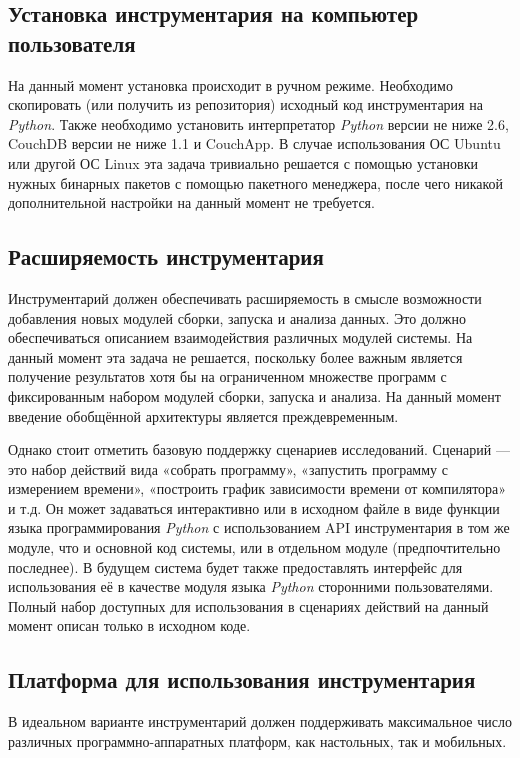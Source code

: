 \subsection{Установка инструментария на компьютер пользователя}
На данный момент установка происходит в ручном режиме. Необходимо скопировать (или получить из репозитория) исходный код инструментария на \textit{Python}. Также необходимо установить интерпретатор \textit{Python} версии не ниже 2.6, CouchDB версии не ниже 1.1 и CouchApp. В случае использования ОС Ubuntu или другой ОС Linux эта задача тривиально решается с помощью установки нужных бинарных пакетов с помощью пакетного менеджера, после чего никакой дополнительной настройки на данный момент не требуется.


\subsection{Расширяемость инструментария}
Инструментарий должен обеспечивать расширяемость в смысле возможности добавления новых модулей сборки, запуска и анализа данных. Это должно обеспечиваться описанием взаимодействия различных модулей системы. На данный момент эта задача не решается, поскольку более важным является получение результатов хотя бы на ограниченном множестве программ с фиксированным набором модулей сборки, запуска и анализа. На данный момент введение обобщённой архитектуры является преждевременным.

Однако стоит отметить базовую поддержку сценариев исследований. Сценарий --- это набор действий вида «собрать программу», «запустить программу с измерением времени», «построить график зависимости времени от компилятора» и т.д. Он может задаваться интерактивно или в исходном файле в виде функции языка программирования \textit{Python} с использованием API инструментария в том же модуле, что и основной код системы, или в отдельном модуле (предпочтительно последнее). В будущем система будет также предоставлять интерфейс для использования её в качестве модуля языка \textit{Python} сторонними пользователями. Полный набор доступных для использования в сценариях действий на данный момент описан только в исходном коде.

\subsection{Платформа для использования инструментария}
В идеальном варианте инструментарий должен поддерживать максимальное число различных программно-аппаратных платформ, как настольных, так и мобильных.


